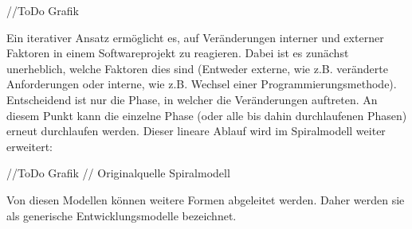 //ToDo Grafik

Ein iterativer Ansatz ermöglicht es, auf Veränderungen interner und externer Faktoren in einem Softwareprojekt zu reagieren. Dabei ist es zunächst unerheblich, welche Faktoren dies sind (Entweder externe, wie z.B. veränderte Anforderungen oder interne, wie z.B. Wechsel einer Programmierungsmethode). Entscheidend ist nur die Phase, in welcher die Veränderungen auftreten. An diesem Punkt kann die einzelne Phase (oder alle bis dahin durchlaufenen Phasen) erneut durchlaufen werden. Dieser lineare Ablauf wird im Spiralmodell weiter erweitert:

//ToDo Grafik
// Originalquelle Spiralmodell
\cite[Abb. 2]{boehm_spiral_1988} 

Von diesen Modellen können weitere Formen abgeleitet werden. Daher werden sie als generische Entwicklungsmodelle bezeichnet.